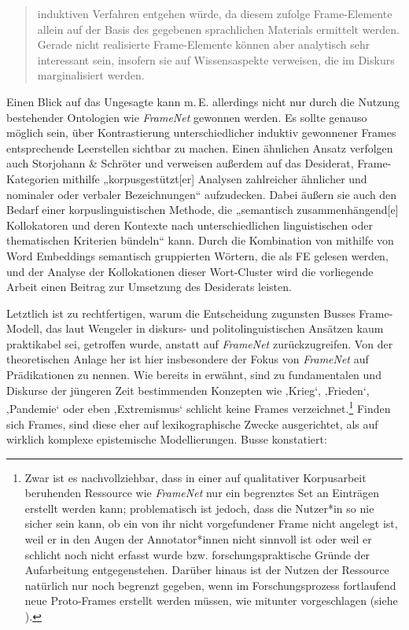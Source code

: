 \begin{quote}
induktiven Verfahren entgehen würde, da diesem zufolge Frame-Elemente allein auf der Basis des gegebenen sprachlichen Materials ermittelt werden. Gerade nicht realisierte Frame-Elemente können aber analytisch sehr interessant sein, insofern sie auf Wissensaspekte verweisen, die im Diskurs marginalisiert werden. \autocite[164]{ziemMedienFramesAlsSemantische2018}
\end{quote}

Einen Blick auf das Ungesagte kann m.\,E. allerdings nicht nur durch die Nutzung bestehender Ontologien wie \emph{FrameNet} gewonnen werden. Es sollte genauso möglich sein, über Kontrastierung unterschiedlicher induktiv gewonnener Frames entsprechende Leerstellen sichtbar zu machen. Einen ähnlichen Ansatz verfolgen auch Storjohann \& Schröter \autocite*{storjohannPrasenzUndAbsenz2013} und verweisen außerdem auf das Desiderat, Frame-Kategorien mithilfe „korpusgestützt{[}er{]} Analysen zahlreicher ähnlicher und nominaler oder verbaler Bezeichnungen`` \autocite*[206]{storjohannPrasenzUndAbsenz2013} aufzudecken. Dabei äußern sie auch den Bedarf einer korpuslinguistischen Methode, die „semantisch zusammenhängend{[}e{]} Kollokatoren und deren Kontexte nach unterschiedlichen linguistischen oder thematischen Kriterien bündeln`` \autocite[205]{storjohannPrasenzUndAbsenz2013} kann. Durch die Kombination von mithilfe von Word Embeddings semantisch gruppierten Wörtern, die als FE gelesen werden, und der Analyse der Kollokationen dieser Wort-Cluster wird die vorliegende Arbeit einen Beitrag zur Umsetzung des Desiderats leisten.

Letztlich ist zu rechtfertigen, warum die Entscheidung zugunsten Busses Frame-Modell, das laut Wengeler \autocite*[23]{wengelerWarnungVorFraming2022} in diskurs- und politolinguistischen Ansätzen kaum praktikabel sei, getroffen wurde, anstatt auf \emph{FrameNet} zurückzugreifen. Von der theoretischen Anlage her ist hier insbesondere der Fokus von \emph{FrameNet} auf Prädikationen zu nennen. Wie bereits in  erwähnt, sind zu fundamentalen und Diskurse der jüngeren Zeit bestimmenden Konzepten wie ‚Krieg`, ‚Frieden`, ‚Pandemie` oder eben ‚Extremismus` schlicht keine Frames verzeichnet.\footnote{Zwar ist es nachvollziehbar, dass in einer auf qualitativer Korpusarbeit beruhenden Ressource wie \emph{FrameNet} nur ein begrenztes Set an Einträgen erstellt werden kann; problematisch ist jedoch, dass die Nutzer*in so nie sicher sein kann, ob ein von ihr nicht vorgefundener Frame nicht angelegt ist, weil er in den Augen der Annotator*innen nicht sinnvoll ist oder weil er schlicht noch nicht erfasst wurde bzw. forschungspraktische Gründe der Aufarbeitung entgegenstehen. Darüber hinaus ist der Nutzen der Ressource natürlich nur noch begrenzt gegeben, wenn im Forschungsprozess fortlaufend neue Proto-Frames erstellt werden müssen, wie mitunter vorgeschlagen (siehe ).} Finden sich Frames, sind diese eher auf lexikographische Zwecke ausgerichtet, als auf wirklich komplexe epistemische Modellierungen. Busse konstatiert:


